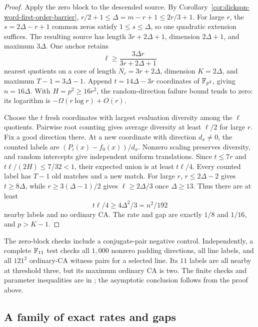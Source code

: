 \begin{proof}
Apply the zero block to the descended source. By
Corollary~\ref{cor:dickson-word-first-order-barrier},
$r/2+1\le\Delta=m-r+1\le2r/3+1$. For large $r$, the
$s=2\Delta-r+1$ common zeros satisfy $1\le s\le\Delta$, so one
quadratic extension suffices. The resulting source has length
$3r+2\Delta+1$, dimension $2\Delta+1$, and maximum $3\Delta$.
One anchor retains
\[
 \ell\ge\frac{3\Delta r}{3r+2\Delta+1}
\]
nearest quotients on a core of length $N_c=3r+2\Delta$, dimension
$K=2\Delta$, and maximum $T-1=3\Delta-1$.
Append $t=14\Delta-3r$ coordinates of $\mathbb F_{p^2}$, giving $n=16\Delta$.
With $H=p^2\ge16r^2$, the random-direction failure bound tends to
zero: its logarithm is $-\Omega(r\log r)+O(r)$.

Choose the $t$ fresh coordinates with largest evaluation diversity
among the $\ell$ quotients. Pairwise root counting gives average
diversity at least $\ell/2$ for large $r$. Fix a good direction there.
At a new coordinate with direction $d_x\ne0$, the counted labels are
$(P_i(x)-f_0(x))/d_x$. Nonzero scaling preserves diversity, and random
intercepts give independent uniform translations. Since $t\le7r$
and $t\ell/(2H)\le7/32<1$, their expected union is at least $t\ell/4$.
Every counted label has $T-1$ old matches and a new match.
For large $r$, $r\le2\Delta-2$ gives $t\ge8\Delta$, while
$r\ge3(\Delta-1)/2$ gives $\ell\ge2\Delta/3$ once $\Delta\ge13$.
Thus there are at least
\[
 t\ell/4\ge4\Delta^2/3=n^2/192
\]
nearby labels and no ordinary CA. The rate and gap are exactly $1/8$
and $1/16$, and $p>K-1$.
\end{proof}

The zero-block checks include a conjugate-pair negative control.
Independently, a complete $\mathbb F_{11}$ test checks all $1{,}000$ nonzero
padding directions, all line labels, and all $121^2$ ordinary-CA witness
pairs for a selected line. Its $11$ labels are all nearby at threshold
three, but its maximum ordinary CA is two. The finite checks and
parameter inequalities are in
;
the asymptotic conclusion follows from the proof above.

\subsection{A family of exact rates and gaps}


